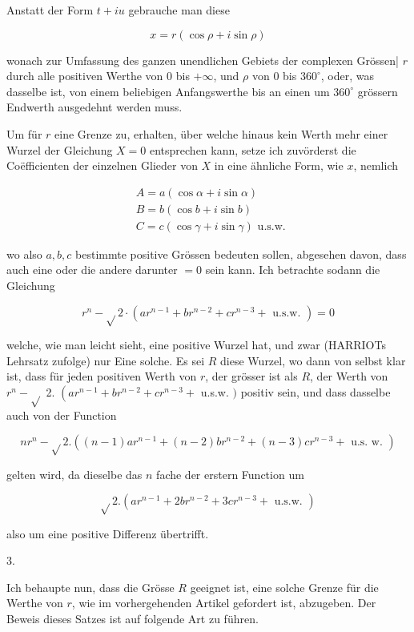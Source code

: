 \documentclass[10pt]{article}
\begin{document}
Anstatt der Form \(t+i u\) gebrauche man diese

\[
x=r(\cos \rho+i \sin \rho)
\]

wonach zur Umfassung des ganzen unendlichen Gebiets der complexen Grössen| \(r\) durch alle positiven Werthe von 0 bis \(+\infty\), und \(\rho\) von 0 bis \(360^{\circ}\), oder, was
dasselbe ist, von einem beliebigen Anfangswerthe bis an einen um \(360^{\circ}\) grössern Endwerth ausgedehnt werden muss.

Um für \(r\) eine Grenze zu, erhalten, über welche hinaus kein Werth mehr einer Wurzel der Gleichung \(X=0\) entsprechen kann, setze ich zuvörderst die Coëfficienten der einzelnen Glieder von \(X\) in eine ähnliche Form, wie \(x\), nemlich

\[
\begin{aligned}
& A=a(\cos \alpha+i \sin \alpha) \\
& B=b(\cos b+i \sin b) \\
& C=c(\cos \gamma+i \sin \gamma) \text { u.s.w. }
\end{aligned}
\]

wo also \(a, b, c\) bestimmte positive Grössen bedeuten sollen, abgesehen davon, dass auch eine oder die andere darunter \(=0\) sein kann. Ich betrachte sodann die Gleichung

\[
r^{n}-\sqrt{ } 2 \cdot\left(a r^{n-1}+b r^{n-2}+c r^{n-3}+\text { u.s.w. }\right)=0
\]

welche, wie man leicht sieht, eine positive Wurzel hat, und zwar (HARRIOTs Lehrsatz zufolge) nur Eine solche. Es sei \(R\) diese Wurzel, wo dann von selbst klar ist, dass für jeden positiven Werth von \(r\), der grösser ist als \(R\), der Werth von \(r^{n}-\sqrt{ }\) 2. \(\left(a r^{n-1}+b r^{n-2}+c r^{n-3}+\right.\) u.s.w. \()\) positiv sein, und dass dasselbe auch von der Function

\[
n r^{n}-\sqrt{ } 2 .\left((n-1) a r^{n-1}+(n-2) b r^{n-2}+(n-3) c r^{n-3}+\text { u.s. w. }\right)
\]

gelten wird, da dieselbe das \(n\) fache der erstern Function um

\[
\sqrt{ } 2 .\left(a r^{n-1}+2 b r^{n-2}+3 c r^{n-3}+\text { u.s.w. }\right)
\]

also um eine positive Differenz übertrifft.

3.

Ich behaupte nun, dass die Grösse \(R\) geeignet ist, eine solche Grenze für die Werthe von \(r\), wie im vorhergehenden Artikel gefordert ist, abzugeben. Der Beweis dieses Satzes ist auf folgende Art zu führen.
\end{document}
